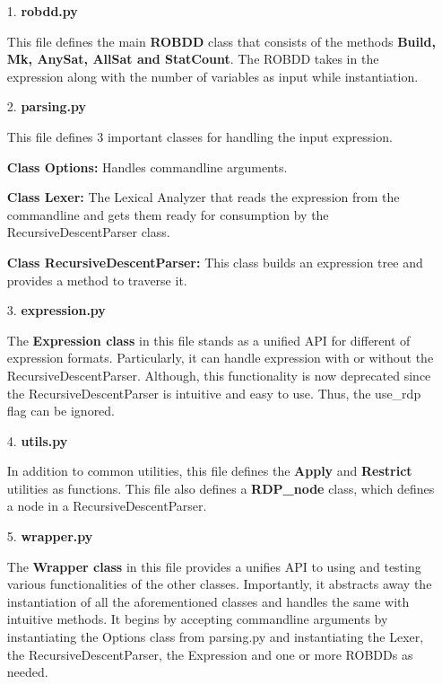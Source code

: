 \documentclass[a4paper, titlepage, 12pt]{article}
\numberwithin{equation}{section}
\begin{document}
        \begin{itemize}
            \item[1.] \textbf{robdd.py}
                
                This file defines the main \textbf{ROBDD} class that consists of the methods \textbf{Build, Mk, AnySat, AllSat and StatCount}.
                The ROBDD takes in the expression along with the number of variables as input while instantiation.
                
            \item[2.] \textbf{parsing.py}
            
                This file defines 3 important classes for handling the input expression.
                
                \textbf{Class Options:} Handles commandline arguments.
                
                \textbf{Class Lexer:} The Lexical Analyzer that reads the expression from the commandline and gets them ready for consumption by the RecursiveDescentParser class.

                \textbf{Class RecursiveDescentParser:} This class builds an expression tree and provides a method to traverse it.

            \item[3.] \textbf{expression.py}
            
                The \textbf{Expression class} in this file stands as a unified API for different of expression formats.
                Particularly, it can handle expression with or without the RecursiveDescentParser.
                Although, this functionality is now deprecated since the RecursiveDescentParser is intuitive and easy to use.
                Thus, the use\_rdp flag can be ignored.

            \item[4.] \textbf{utils.py}
            
                In addition to common utilities, this file defines the \textbf{Apply} and \textbf{Restrict} utilities as functions.
                This file also defines a \textbf{RDP\_node} class, which defines a node in a RecursiveDescentParser.
            
            \item[5.] \textbf{wrapper.py}
            
                The \textbf{Wrapper class} in this file provides a unifies API to using and testing various functionalities of the other classes.
                Importantly, it abstracts away the instantiation of all the aforementioned classes and handles the same with intuitive methods.
                It begins by accepting commandline arguments by instantiating the Options class from parsing.py and instantiating the Lexer, the RecursiveDescentParser, the Expression and one or more ROBDDs as needed.


\end{itemize}
\end{document}

